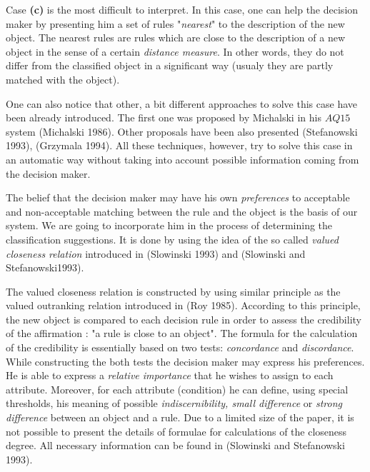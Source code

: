 Case {\bf (c)} is the most difficult to interpret. In  this   case,
one  can help the decision maker by presenting him a set  of  rules
"{\it nearest}" to the description of the new object. The   nearest
rules  are  rules which are close  to  the  description  of  a  new
object in the sense of  a certain {\it distance measure}. In  other
words,  they  do  not  differ  from  the  classified  object  in  a
significant way (usualy they are partly matched with the object).

One can also notice that other, a  bit  different  approaches   to
solve this case have been already introduced.  The  first  one  was
proposed  by  Michalski   in   his   $AQ15$   system   (Michalski 1986).
Other  proposals  have  been  also   presented
(Stefanowski 1993), (Grzymala 1994).  All  these techniques, however, try  to
solve  this  case  in  an  automatic   way  without  taking  into
account  possible  information  coming  from  the decision maker.

The belief that  the  decision  maker may  have   his   own   {\it
preferences} to acceptable and  non-acceptable   matching   between
the  rule  and  the object is the basis of our system. We are going
to incorporate him in the process of determining the classification
suggestions. It is  done by using the idea of the so called {\it  valued
closeness relation} introduced in (Slowinski 1993) and (Slowinski and
Stefanowski1993).

The valued closeness relation is constructed by using similar  principle
as the valued outranking relation  introduced  in  (Roy 1985).
According to this principle, the new object  is   compared   to  each
decision rule in  order  to  assess  the  credibility  of   the
affirmation : "a rule is close to  an  object".  The  formula  for the
calculation of the credibility is essentially based on  two tests: {\it
concordance} and {\it discordance}.
While constructing the both tests the
decision  maker may  express  his  preferences.  He  is able to
express  a {\it relative importance}  that  he  wishes   to  assign
to each  attribute.  Moreover,  for  each attribute (condition)
he  can  define,  using   special   thresholds,   his   meaning   of
possible   {\it
indiscernibility,  small  difference}  or  {\it strong  difference}
between an object and a rule.
Due to a limited size of the paper, it is not  possible  to  present
the details of formulae for calculations of the closeness  degree.
All necessary information can be found in (Slowinski and Stefanowski 1993).

